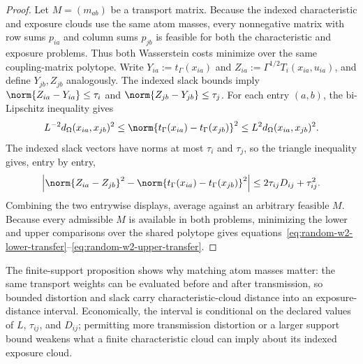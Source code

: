 \begin{proof}
  Let $M=(m_{ab})$ be a transport matrix. Because the indexed characteristic
  and exposure clouds use the same atom masses, every nonnegative matrix with
  row sums $p_{ia}$ and column sums $p_{jb}$ is feasible for both the
  characteristic and exposure problems. Thus both Wasserstein costs minimize
  over the same coupling-matrix polytope.
  Write $Y_{ia}:=t_\Gamma(x_{ia})$ and
  $Z_{ia}:=\Gamma^{1/2}T_i(x_{ia},u_{ia})$, and define $Y_{jb},Z_{jb}$
  analogously. The indexed slack bounds imply
  $\norm{Z_{ia}-Y_{ia}}\le\tau_i$ and
  $\norm{Z_{jb}-Y_{jb}}\le\tau_j$.
  For each entry $(a,b)$, the bi-Lipschitz inequality gives
  \[
    L^{-2}d_\Omega(x_{ia},x_{jb})^2
    \le \norm{t_\Gamma(x_{ia})-t_\Gamma(x_{jb})}^2
    \le L^2d_\Omega(x_{ia},x_{jb})^2.
  \]
  The indexed slack vectors have norms at most $\tau_i$ and $\tau_j$, so the
  triangle inequality gives, entry by entry,
  \[
    \left|
    \norm{Z_{ia}-Z_{jb}}^2
    -\norm{t_\Gamma(x_{ia})-t_\Gamma(x_{jb})}^2
    \right|
    \le 2\tau_{ij}D_{ij}+\tau_{ij}^2.
  \]
  Combining the two entrywise displays, average against an arbitrary feasible
  $M$. Because every admissible $M$ is available in both problems, minimizing
  the lower and upper comparisons over the shared polytope gives
  equations~\ref{eq:random-w2-lower-transfer}--\ref{eq:random-w2-upper-transfer}.
\end{proof}

The finite-support proposition shows why matching atom masses matter: the
same transport weights can be evaluated before and after transmission, so
bounded distortion and slack carry characteristic-cloud distance into an
exposure-distance interval.
Economically, the interval is conditional on the declared values of $L$,
$\tau_{ij}$, and $D_{ij}$; permitting more transmission distortion or a
larger support bound weakens what a finite characteristic cloud can imply
about its indexed exposure cloud.
